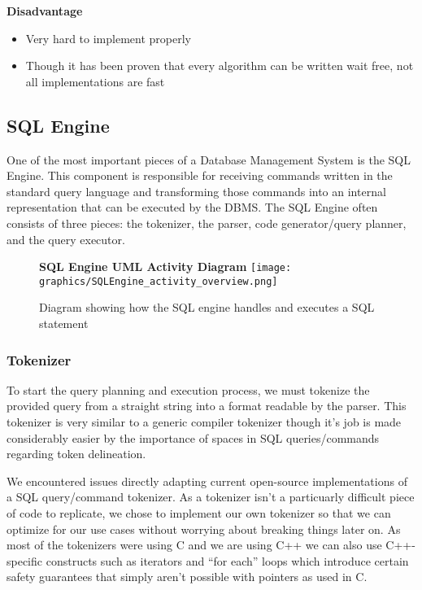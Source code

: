 \documentclass[letterpaper, 12pt]{article}
\begin{document}
{\bfseries Disadvantage}
\par\vspace{\baselineskip}
\begin{itemize}

	\item Very hard to implement properly
	\item Though it has been proven that every algorithm can be written wait free, not all implementations are fast
\end{itemize}

\newpage
\subsection{SQL Engine}
One of the most important pieces of a Database Management System is the SQL Engine.
This component is responsible for receiving commands written in the standard query
language and transforming those commands into an internal representation that can be
executed by the DBMS. The SQL Engine often consists of three pieces: the tokenizer, the
parser, code generator/query planner, and the query executor.

\begin{figure}
  \centering
  \textbf{SQL Engine UML Activity Diagram}
  \texttt{[image: graphics/SQLEngine\_activity\_overview.png]}
  \caption{Diagram showing how the SQL engine handles and executes a SQL statement}
\end{figure}

\subsubsection{Tokenizer}
To start the query planning and execution process, we must tokenize the provided query
from a straight string into a format readable by the parser. This tokenizer is very
similar to a generic compiler tokenizer though it's job is made considerably easier
by the importance of spaces in SQL queries/commands regarding token delineation.
\par\vspace{\baselineskip}
We encountered issues directly adapting current open-source implementations of a
SQL query/command tokenizer. As a tokenizer isn't a particuarly difficult piece of
code to replicate, we chose to implement our own tokenizer so that
we can optimize for our use cases without worrying about breaking things later on.
As most of the tokenizers were using C and we are using C++ we can also use C++-specific
constructs such as iterators and ``for each'' loops which introduce certain safety guarantees
that simply aren't possible with pointers as used in C.
\end{document}
